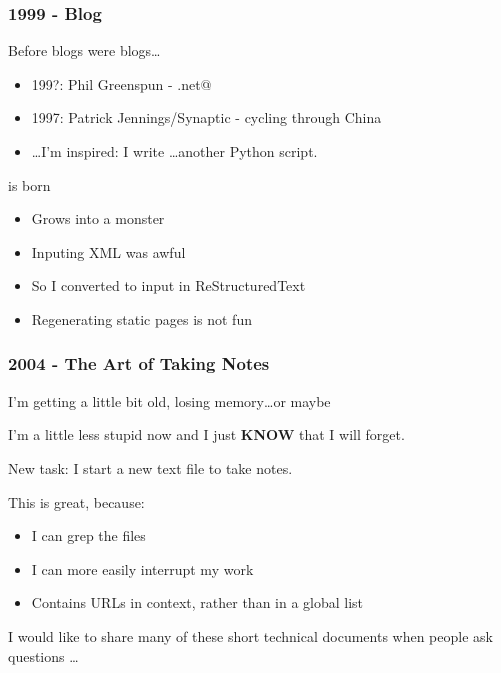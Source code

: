 \documentclass[compress,trans]{beamer}
\begin{document}
\begin{frame}[fragile]
  \frametitle{1999 - Blog}

  Before blogs were blogs\dots

  \begin{itemize}
  \item 199?: Phil Greenspun - \verb@photo.net@
  \item 1997: Patrick Jennings/Synaptic - cycling through China
  \item \dots I'm inspired: I write \dots another Python script.
  \end{itemize}

\vfill\pause

  \verb@adventures@ is born
  \begin{itemize}
    \item Grows into a monster
    \item Inputing XML was awful
    \item So I converted to input in ReStructuredText
    \item Regenerating static pages is not fun
  \end{itemize}

\end{frame}



% 
% 


\begin{frame}[fragile]
  \frametitle{2004 - The Art of Taking Notes}

  I'm getting a little bit old, losing memory\dots  \pause or maybe \\

\vfill

  I'm a little less stupid now and I just \textbf{KNOW} that I will forget. \\

\vfill\pause

  New task: I start a new text file to take notes.

  This is great, because:
  \begin{itemize}
    \item I can grep the files

    \item I can more easily interrupt my work

    \item Contains URLs in context, rather than in a global list

  \end{itemize}

  I would like to share many of these short technical documents when people
  ask questions \dots

\end{frame}
\end{document}
